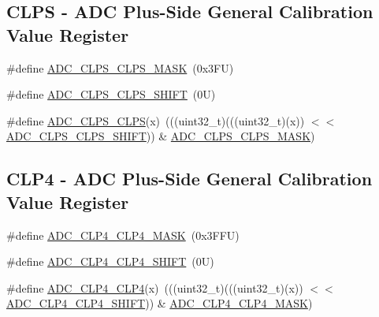 \subsection*{C\+L\+PS -\/ A\+DC Plus-\/\+Side General Calibration Value Register}
\begin{DoxyCompactItemize}
\item 
\#define \mbox{\hyperlink{group___a_d_c___register___masks_gaccedf61066feb0b1c6d6bd7794d2a79c}{A\+D\+C\+\_\+\+C\+L\+P\+S\+\_\+\+C\+L\+P\+S\+\_\+\+M\+A\+SK}}~(0x3\+F\+U)
\item 
\#define \mbox{\hyperlink{group___a_d_c___register___masks_ga94f5e6c337622e8c4b8d03201e1c2d11}{A\+D\+C\+\_\+\+C\+L\+P\+S\+\_\+\+C\+L\+P\+S\+\_\+\+S\+H\+I\+FT}}~(0\+U)
\item 
\#define \mbox{\hyperlink{group___a_d_c___register___masks_ga7b8e212b6c7c8504784c5af551e2b6bd}{A\+D\+C\+\_\+\+C\+L\+P\+S\+\_\+\+C\+L\+PS}}(x)~(((uint32\+\_\+t)(((uint32\+\_\+t)(x)) $<$$<$ \mbox{\hyperlink{group___a_d_c___register___masks_ga94f5e6c337622e8c4b8d03201e1c2d11}{A\+D\+C\+\_\+\+C\+L\+P\+S\+\_\+\+C\+L\+P\+S\+\_\+\+S\+H\+I\+FT}})) \& \mbox{\hyperlink{group___a_d_c___register___masks_gaccedf61066feb0b1c6d6bd7794d2a79c}{A\+D\+C\+\_\+\+C\+L\+P\+S\+\_\+\+C\+L\+P\+S\+\_\+\+M\+A\+SK}})
\end{DoxyCompactItemize}
\subsection*{C\+L\+P4 -\/ A\+DC Plus-\/\+Side General Calibration Value Register}
\begin{DoxyCompactItemize}
\item 
\#define \mbox{\hyperlink{group___a_d_c___register___masks_ga877d163ca4067627ebb29125d75eb757}{A\+D\+C\+\_\+\+C\+L\+P4\+\_\+\+C\+L\+P4\+\_\+\+M\+A\+SK}}~(0x3\+F\+F\+U)
\item 
\#define \mbox{\hyperlink{group___a_d_c___register___masks_gaee16600c1dd7fefead073d24320818a4}{A\+D\+C\+\_\+\+C\+L\+P4\+\_\+\+C\+L\+P4\+\_\+\+S\+H\+I\+FT}}~(0\+U)
\item 
\#define \mbox{\hyperlink{group___a_d_c___register___masks_gac1366655a895ce73fc06cd74002258a5}{A\+D\+C\+\_\+\+C\+L\+P4\+\_\+\+C\+L\+P4}}(x)~(((uint32\+\_\+t)(((uint32\+\_\+t)(x)) $<$$<$ \mbox{\hyperlink{group___a_d_c___register___masks_gaee16600c1dd7fefead073d24320818a4}{A\+D\+C\+\_\+\+C\+L\+P4\+\_\+\+C\+L\+P4\+\_\+\+S\+H\+I\+FT}})) \& \mbox{\hyperlink{group___a_d_c___register___masks_ga877d163ca4067627ebb29125d75eb757}{A\+D\+C\+\_\+\+C\+L\+P4\+\_\+\+C\+L\+P4\+\_\+\+M\+A\+SK}})
\end{DoxyCompactItemize}
